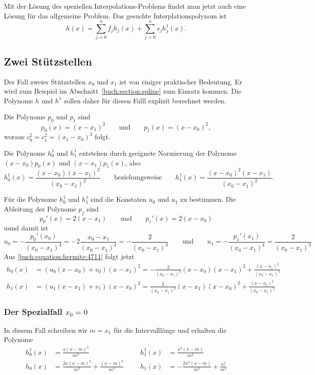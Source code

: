 Mit der Lösung des speziellen Interpolations-Problems findet man jetzt
auch eine Lösung für das allgemeine Problem.
Das gesuchte Interplationspolynom ist
\[
h(x) 
=
\sum_{j=0}^n f_j h_j(x)
+
\sum_{j=0}^n s_j h^1_j(x).
\]

\subsection{Zwei Stützstellen
\label{buch:subsection:hermite:zweistuetzstellen}}
Der Fall zweier Stützstellen $x_0$ und $x_1$ ist von einiger praktischer
Bedeutung.
Er wird zum Beispiel im Abschnitt~\ref{buch:section:spline}
zum Einsatz kommen.
Die Polynome $h$ und $h^1$ sollen daher für diesen Falll explizit
berechnet werden.

Die Polynome $p_0$ und $p_1$ sind
\[
p_0(x) = (x-x_1)^2
\qquad\text{und}\qquad
p_1(x) = (x-x_0)^2,
\]
woraus $c_0^2 = c_1^2 = (x_1-x_0)^2$ folgt.

Die Polynome $h_0^1$ und $h_1^1$ entstehen durch geeignete Normierung
der Polynome $(x-x_0)p_0(x)$ und $(x-x_1)p_1(x)$, also
\[
h_0^1(x)
=
\frac{(x-x_0)(x-x_1)^2}{(x_0-x_1)^2}
\qquad\text{beziehungsweise}\qquad
h_1^1(x)
=
\frac{(x-x_0)^2(x-x_1)}{(x_0-x_1)^2}.
\]

Für die Polynome $h^1_0$ und $h^1_1$ sind die Konstaten $u_0$ und $u_1$
zu bestimmen.
Die Ableitung der Polynome $p_j$ sind
\[
p_0'(x) = 2(x-x_1)
\qquad\text{und}\qquad
p_1'(x) = 2(x-x_0)
\]
uund damit ist
\[
u_0
=
-\frac{p_0'(x_0) }{(x_0-x_1)^4}
=
-2\frac{x_0-x_1}{(x_0-x_1)^4}
=
-\frac{2}{(x_0-x_1)^3}
\qquad\text{und}\qquad
u_1
=
-\frac{p_1'(x_1) }{(x_0-x_1)^4}
=
\frac{2}{(x_0-x_1)^3}
\]
Aus \eqref{buch:equation:hermite:4711} folgt jetzt
\begin{align*}
h_0(x)
&=
(u_0(x-x_0)+v_0)(x-x_1)^2
=
-\frac{2}{(x_0-x_1)^3}(x-x_0)(x-x_1)^2 + \frac{(x-x_1)^2}{(x_0-x_1)^4}
\\
h_1(x)
&=
(u_1(x-x_1)+v_1)(x-x_0)^2
=
\frac{2}{(x_0-x_1)^3}(x-x_1)(x-x_0)^2 +\frac{(x-x_0)^2}{(x_0-x_1)^2}
\end{align*}

\subsubsection{Der Spezialfall $x_0=0$}
In diesem Fall schreiben wir $m=x_1$ für die Intervalllänge und erhalten
die Polynome
\begin{equation}
\begin{aligned}
h_0^1(x) &= \frac{x(x-m)^2}{m^2}
&&&
h_1^1(x) &= \frac{x^2(x-m)}{m^2}
\\
h_0(x)   &= \frac{2x(x-m)^2}{m^3} +\frac{(x-m)^2}{m^4}
&&&
h_1(x)   &= -\frac{2x^2(x-m)}{m^3} +\frac{x^2}{m^4}
\end{aligned}
\end{equation}


